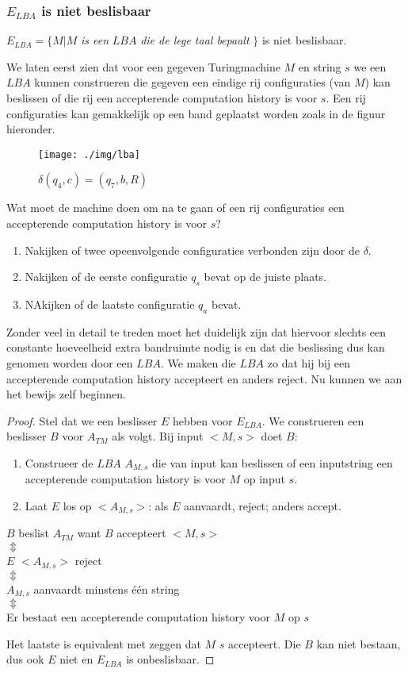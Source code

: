 \subsubsection*{$E_{LBA}$ is niet beslisbaar}

\begin{theorem}
	$E_{LBA} = \{M|M$ \textit{is een} $LBA$ \textit{die de lege taal bepaalt} $\}$ is niet beslisbaar. 
\end{theorem}

We laten eerst zien dat voor een gegeven Turingmachine $M$ en string $s$ we een $LBA$ kunnen construeren die gegeven een eindige rij configuraties (van $M$) kan beslissen of die rij een accepterende computation history is voor $s$. Een rij configuraties kan gemakkelijk op een band geplaatst worden zoals in de figuur hieronder.
	\begin{figure}[H]
  	\centering
    	  \texttt{[image: ./img/lba]}
  	\caption{$\delta(q_4,c)=(q_7,b,R)$}
	\end{figure}
Wat moet de machine doen om na te gaan of een rij configuraties een accepterende computation history is voor $s$?
\begin{enumerate}
	\item Nakijken of twee opeenvolgende configuraties verbonden zijn door de $\delta$.
	\item Nakijken of de eerste configuratie $q_s$ bevat op de juiste plaats.
	\item NAkijken of de laatste configuratie $q_a$ bevat.
\end{enumerate}
Zonder veel in detail te treden moet het duidelijk zijn dat hiervoor slechts een constante hoeveelheid extra bandruimte nodig is en dat die beslissing dus kan  genomen worden door een $LBA$. We maken die $LBA$ zo dat hij bij een accepterende computation history accepteert en anders reject. Nu kunnen we aan het bewijs zelf beginnen.

\begin{proof}
	Stel dat we een beslisser $E$ hebben voor $E_{LBA}$. We construeren een beslisser $B$ voor $A_{TM}$ als volgt. Bij input $<M,s>$ doet $B$:
	\begin{enumerate}
		\item Construeer de $LBA$ $A_{M,s}$ die van input kan beslissen of een inputstring een accepterende computation history is voor $M$ op input $s$.
		\item Laat $E$ los op $<A_{M,s}>$: als $E$ aanvaardt, reject; anders accept.
	\end{enumerate}
	\begin{center}
		$B$ beslist $A_{TM}$ want $B$ accepteert $<M,s>$\\
		$\Updownarrow$\\
		$E$ $<A_{M,s}>$ reject\\
		$\Updownarrow$\\
		$A_{M,s}$ aanvaardt minstens \'e\'en string\\
		$\Updownarrow$\\
		Er bestaat een accepterende computation history voor $M$ op $s$
	\end{center}
	Het laatste is equivalent met zeggen dat $M$ $s$ accepteert.
	Die $B$ kan niet bestaan, dus ook $E$ niet en $E_{LBA}$ is onbeslisbaar.
\end{proof}